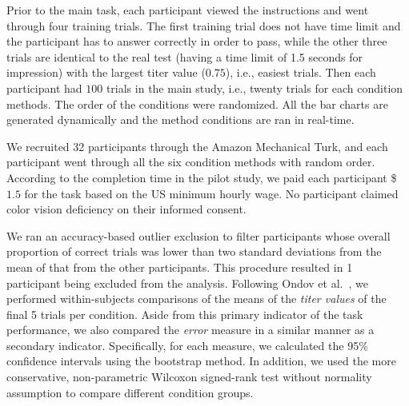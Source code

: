 {
Prior to the main task, each participant viewed the instructions and went through four training trials. The first training trial does not have time limit and the participant has to answer correctly in order to pass, while the other three trials are identical to the real test (having a time limit of 1.5 seconds for impression) with the largest titer value ($0.75$), i.e., easiest trials. Then each participant had $100$ trials in the main study, i.e., twenty trials for each condition methods. The order of the conditions were randomized. All the bar charts are generated dynamically and the method conditions are ran in real-time.

\vspace{.3em}
We recruited 32 participants through the Amazon Mechanical Turk, and each participant went through all the six condition methods with random order.
According to the completion time in the pilot study, we paid each participant \$$1.5$ for the task based on the US minimum hourly wage.
No participant claimed color vision deficiency on their informed consent.


We ran an accuracy-based outlier exclusion to filter participants whose overall proportion of correct trials was lower than two standard deviations from the mean of that from the other participants. This procedure resulted in 1 participant being excluded from the analysis. Following Ondov et al.~\cite{Ondov19}, we performed within-subjects comparisons of the means of the \emph{titer values} of the final 5 trials per condition. Aside from this primary indicator of the task performance, we also compared the \emph{error} measure in a similar manner as a secondary indicator. Specifically, for each measure, we calculated the 95\% confidence intervals using the bootstrap method. In addition, we used the more conservative, non-parametric Wilcoxon signed-rank test without normality assumption to compare different condition groups.

}

